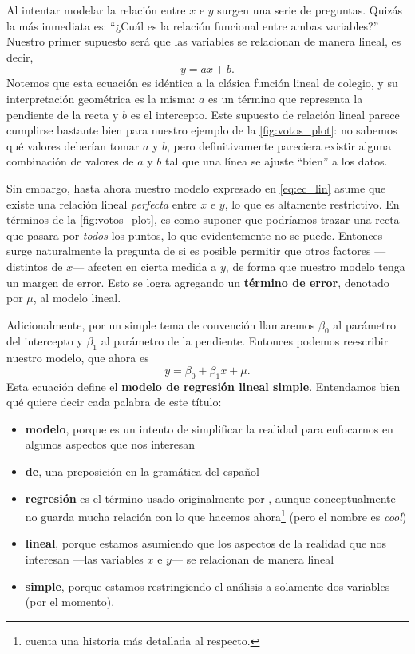 \documentclass{report}\usepackage[]{graphicx}\usepackage[]{color}
\newcommand*{\eng}[1]{\textsl{#1}}
\newcommand*{\kw}[1]{\textbf{#1}\index{#1}}
\begin{document}
Al intentar modelar la relación entre $x$ e $y$ surgen una serie de preguntas. Quizás la más inmediata es: ``¿Cuál es la relación funcional entre ambas variables?''
Nuestro primer supuesto será que las variables se relacionan de manera lineal, es decir,
\begin{equation}
y = ax + b.
\label{eq:ec_lin}
\end{equation}
Notemos que esta ecuación es idéntica a la clásica función lineal de colegio, y su interpretación geométrica es la misma: $a$ es un término que representa la pendiente de la recta y $b$ es el intercepto.
Este supuesto de relación lineal parece cumplirse bastante bien para nuestro ejemplo de la \autoref{fig:votos_plot}: no sabemos qué valores deberían tomar $a$ y $b$, pero definitivamente pareciera existir alguna combinación de valores de $a$ y $b$ tal que una línea se ajuste ``bien'' a los datos.

Sin embargo, hasta ahora nuestro modelo expresado en \eqref{eq:ec_lin} asume que existe una relación lineal \emph{perfecta} entre $x$ e $y$, lo que es altamente restrictivo. 
En términos de la \autoref{fig:votos_plot}, es como suponer que podríamos trazar una recta que pasara por \emph{todos} los puntos, lo que evidentemente no se puede.
Entonces surge naturalmente la pregunta de si es posible permitir que otros factores ---distintos de $x$--- afecten en cierta medida a $y$, de forma que nuestro modelo tenga un margen de error.
Esto se logra agregando un \kw{término de error}, denotado por $\mu$, al modelo lineal.

Adicionalmente, por un simple tema de convención llamaremos $\beta_0$ al parámetro del intercepto y $\beta_1$ al parámetro de la pendiente.
Entonces podemos reescribir nuestro modelo, que ahora es
\begin{equation}
y = \beta_0 + \beta_1x + \mu.
\label{eq:modelo_lineal_simple_poblacional}
\end{equation}
Esta ecuación define el \kw{modelo de regresión lineal simple}. Entendamos bien qué quiere decir cada palabra de este título:
\begin{itemize}
\item \textbf{modelo}, porque es un intento de simplificar la realidad para enfocarnos en algunos aspectos que nos interesan
\item \textbf{de}, una preposición en la gramática del español
\item \textbf{regresión} es el término usado originalmente por \textcite{galton_regression_1886}, aunque conceptualmente no guarda mucha relación con lo que hacemos ahora\footnote{\textcite{stigler_history_1986} cuenta una historia más detallada al respecto.} (pero el nombre es \eng{cool})
\item \textbf{lineal}, porque estamos asumiendo que los aspectos de la realidad que nos interesan ---las variables $x$ e $y$--- se relacionan de manera lineal
\item \textbf{simple}, porque estamos restringiendo el análisis a solamente dos variables (por el momento).
\end{itemize}
\end{document}
